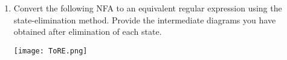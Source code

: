 \documentclass[ x11names, dvipsnames, usenames]{article}
\begin{document}
\begin{enumerate}
\begin{comment}
 
 
\vspace{2mm}\hrule\vspace{2mm}
\end{comment}




 \item Convert the following NFA to an equivalent regular expression using the state-elimination method. Provide the intermediate diagrams you have obtained after elimination of each state.
 \begin{center}
 \texttt{[image: ToRE.png]}
 \end{center}

\begin{comment}
\vspace{2mm}\hrule\vspace{2mm}
\textbf{Solution.}  \\[0.5mm]
 
 
 
 
 
  
 
\vspace{2mm}\hrule\vspace{2mm}
\end{comment}






\end{enumerate}
\end{document}
